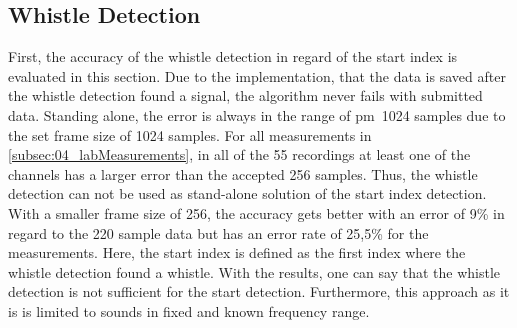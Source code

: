 
\subsection{Whistle Detection}
\label{subsec:04_wd}

First, the accuracy of the whistle detection in regard of the start index
is evaluated in this section.
Due to the implementation, that the data is saved after the whistle detection
found a signal, the algorithm never fails with submitted data.
Standing alone, the error is always in the range of \si{\pm1024} samples due to the
set frame size of 1024 samples.
For all measurements in \cref{subsec:04_labMeasurements}, in all of the 55 recordings
at least one of the channels has a larger error than
the accepted 256 samples.
Thus, the whistle detection can not be used as stand-alone solution of the start index
detection.
With a smaller frame size of 256, the accuracy gets better with an error of
9\si{\percent} in regard to the 220 sample data but has an error rate of
25,5\si{\percent} for the measurements.
Here, the start index is defined as the first index where the whistle detection
found a whistle.
With the results, one can say that the whistle detection is not sufficient
for the start detection.
Furthermore, this approach as it is is limited to sounds in fixed and known frequency range.


